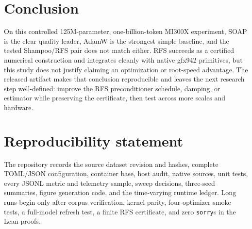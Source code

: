 \documentclass[10pt]{article}
\newcommand{\RFS}{\textsc{RFS}}
\begin{document}
\section{Conclusion}
On this controlled 125M-parameter, one-billion-token MI300X experiment, SOAP is
the clear quality leader, AdamW is the strongest simple baseline, and the tested
Shampoo/RFS pair does not match either. RFS succeeds as a certified numerical
construction and integrates cleanly with native gfx942 primitives, but this study
does not justify claiming an optimization or root-speed advantage. The released
artifact makes that conclusion reproducible and leaves the next research step
well-defined: improve the RFS preconditioner schedule, damping, or estimator while
preserving the certificate, then test across more scales and hardware.

\section{Reproducibility statement}
The repository records the source dataset revision and hashes, complete TOML/JSON
configuration, container base, host audit, native sources, unit tests, every JSONL
metric and telemetry sample, sweep decisions, three-seed summaries, figure
generation code, and the time-varying runtime ledger. Long runs begin only after
corpus verification, kernel parity, four-optimizer smoke tests, a full-model
refresh test, a finite \RFS{} certificate, and zero \texttt{sorry}s in the Lean proofs.



\end{document}
